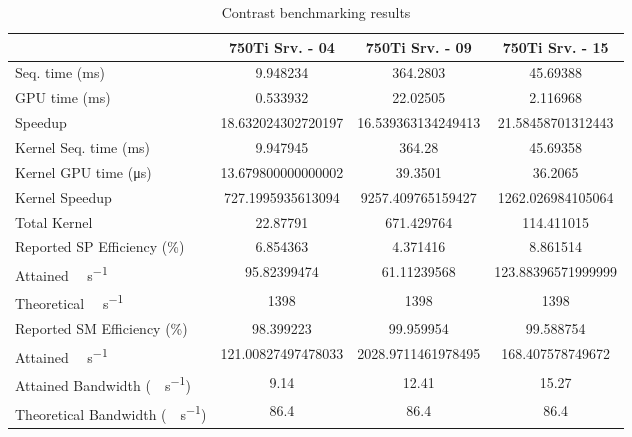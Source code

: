 \begin{table}[H]
	\centering
	\caption{Contrast benchmarking results}
	\label{tab:contrast-results}
	\begin{tabular}{lS[table-format=7.1]S[table-format=7.1]S[table-format=7.1]}
		\toprule
			~ & {\textbf{750Ti Srv. - 04}} & {\textbf{750Ti Srv. - 09}} & {\textbf{750Ti Srv. - 15}} \\
		\midrule
			{Seq. time (\si{\milli\second})} & 9.948234 & 364.2803 & 45.69388 \\
			{GPU time (\si{\milli\second})} & 0.533932 & 22.02505 & 2.116968 \\
			{Speedup} & 18.632024302720197 &16.539363134249413 & 21.58458701312443 \\
		\midrule
			{Kernel Seq. time (\si{\milli\second})} & 9.947945 & 364.28 & 45.69358 \\
			{Kernel GPU time (\si{\micro\second})} & 13.679800000000002 & 39.3501 & 36.2065 \\
			{Kernel Speedup} & 727.1995935613094 & 9257.409765159427 & 1262.026984105064 \\
		\midrule
			{Total Kernel \si{\mega\flops}} & 22.87791 & 671.429764 & 114.411015 \\
			{Reported SP Efficiency (\si{\percent})} & 6.854363 & 4.371416 & 8.861514 \\
			{Attained \si{\giga\flops\per\second}} & 95.82399474 & 61.11239568 & 123.88396571999999 \\
			{Theoretical \si{\giga\flops\per\second}} & 1398 & 1398 & 1398 \\
		\midrule
			{Reported SM Efficiency (\si{\percent})} & 98.399223 & 99.959954 & 99.588754 \\
			{Attained \si{\giga\iops\per\second}} & 121.00827497478033 & 2028.9711461978495 & 168.407578749672 \\			
		\midrule
			{Attained Bandwidth (\si{\giga\byte\per\second})} & 9.14 & 12.41  & 15.27 \\
			{Theoretical Bandwidth (\si{\giga\byte\per\second})}	& 86.4 & 86.4 & 86.4 \\
		\bottomrule
	\end{tabular}
\end{table}